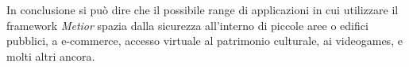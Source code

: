 In conclusione si può dire che il possibile range di applicazioni in cui utilizzare il framework \emph{Metior}
spazia dalla sicurezza all'interno di piccole aree o edifici pubblici, a e-commerce, accesso virtuale al patrimonio culturale,
 ai videogames, e molti altri ancora.
